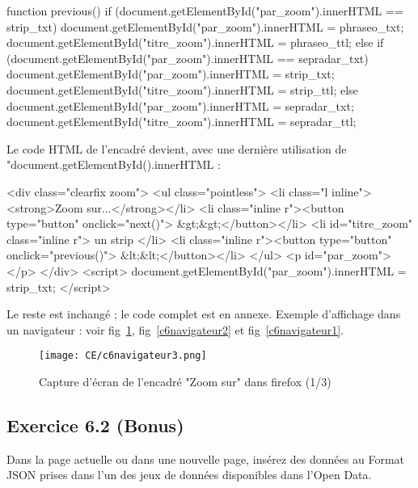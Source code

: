 \documentclass[11pt]{article}
\begin{document}
\smallskip

\begin{code2}
			function previous() {
				if (document.getElementById("par_zoom").innerHTML == strip_txt) {
					document.getElementById("par_zoom").innerHTML = phraseo_txt;
					document.getElementById("titre_zoom").innerHTML = phraseo_ttl;
				} else if (document.getElementById("par_zoom").innerHTML == sepradar_txt) {
					document.getElementById("par_zoom").innerHTML = strip_txt;
					document.getElementById("titre_zoom").innerHTML = strip_ttl;
				} else {
					document.getElementById("par_zoom").innerHTML = sepradar_txt;
					document.getElementById("titre_zoom").innerHTML = sepradar_ttl;
				}
			}\end{code2}

Le code HTML de l’encadré devient, avec une dernière utilisation de "document.getElementById().innerHTML :

\smallskip

\begin{code2}
		<div class="clearfix zoom">
			<ul class="pointless">
				<li class="l inline"><strong>Zoom sur...</strong></li>
				<li class="inline r"><button type="button" onclick="next()"> &gt;&gt;</button></li>
				<li id="titre_zoom" class="inline r"> un strip </li>
				<li class="inline r"><button type="button" onclick="previous()"> &lt;&lt;</button></li>
			</ul>
			<p id="par_zoom"></p>
		</div>
		<script>
				document.getElementById("par_zoom").innerHTML = strip_txt;
		</script>\end{code2}
		
Le reste est inchangé ; le code complet est en annexe. Exemple d’affichage dans un navigateur : voir fig~\ref{c6navigateur3}, fig~\ref{c6navigateur2} et fig~\ref{c6navigateur1}.


		
		\begin{figure}[h]
		\texttt{[image: CE/c6navigateur3.png]}
		\caption{Capture d’écran de l’encadré "Zoom sur" dans firefox (1/3)}
		\label{c6navigateur3}
		\end{figure}


	\subsection*{Exercice 6.2 (Bonus)}
	
Dans la page actuelle ou dans une nouvelle page, insérez des données au Format JSON prises dans l’un des jeux de données disponibles dans l’Open Data.
\end{document}
